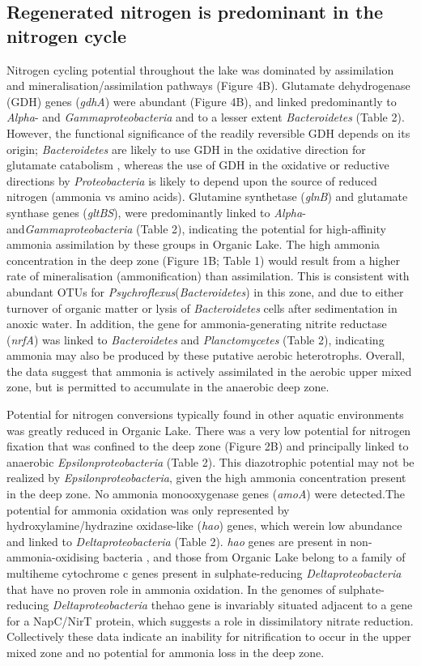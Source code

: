 \subsection{Regenerated nitrogen is predominant in the nitrogen cycle}
Nitrogen cycling potential throughout the lake was dominated by assimilation and mineralisation/assimilation pathways (Figure 4B). 
Glutamate dehydrogenase (GDH) genes (\emph{gdhA}) were abundant (Figure 4B), and linked predominantly to \emph{Alpha}- and \emph{Gammaproteobacteria} and to a lesser extent \emph{Bacteroidetes} (Table 2). 
However, the functional significance of the readily reversible GDH depends on its origin; \emph{Bacteroidetes} are likely to use GDH in the oxidative direction for glutamate catabolism \cite{Williams2012b}, whereas the use of GDH in the oxidative or reductive directions by \emph{Proteobacteria} is likely to depend upon the source of reduced nitrogen (ammonia vs amino acids). 
Glutamine synthetase (\emph{glnB}) and glutamate synthase genes (\emph{gltBS}), were predominantly linked to \emph{Alpha}- and\emph{Gammaproteobacteria} (Table 2), indicating the potential for high-affinity ammonia assimilation by these groups in Organic Lake. 
The high ammonia concentration in the deep zone (Figure 1B; Table 1) would result from a higher rate of mineralisation (ammonification) than assimilation. 
This is consistent with abundant \acp{OTU} for \emph{Psychroflexus}(\emph{Bacteroidetes}) in this zone, and due to either turnover of organic matter or lysis of \emph{Bacteroidetes} cells after sedimentation in anoxic water. 
In addition, the gene for ammonia-generating nitrite reductase (\emph{nrfA}) was linked to \emph{Bacteroidetes} and \emph{Planctomycetes} (Table 2), indicating ammonia may also be produced by these putative aerobic heterotrophs. 
Overall, the data suggest that ammonia is actively assimilated in the aerobic upper mixed zone, but is permitted to accumulate in the anaerobic deep zone.

Potential for nitrogen conversions typically found in other aquatic environments was greatly reduced in Organic Lake. 
There was a very low potential for nitrogen fixation that was confined to the deep zone (Figure 2B) and principally linked to anaerobic \emph{Epsilonproteobacteria} (Table 2). 
This diazotrophic potential may not be realized by \emph{Epsilonproteobacteria}, given the high ammonia concentration present in the deep zone. 
No ammonia monooxygenase genes (\emph{amoA}) were detected.The potential for ammonia oxidation was only represented by hydroxylamine/hydrazine oxidase-like (\emph{hao}) genes, which werein low abundance and linked to \emph{Deltaproteobacteria} (Table 2). 
\emph{hao} genes are present in non-ammonia-oxidising bacteria \cite{Bergmann2005}, and those from Organic Lake belong to a family of multiheme cytochrome c genes present in sulphate-reducing \emph{Deltaproteobacteria} that have no proven role in ammonia oxidation. 
In the genomes of sulphate-reducing \emph{Deltaproteobacteria} thehao gene is invariably situated adjacent to a gene for a NapC/NirT protein, which suggests a role in dissimilatory nitrate reduction. 
Collectively these data indicate an inability for nitrification to occur in the upper mixed zone and no potential for ammonia loss in the deep zone.

